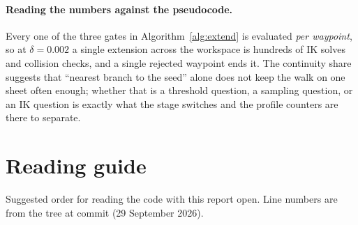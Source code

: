 \documentclass[11pt,a4paper]{article}
\newcommand{\code}[1]{\texttt{\detokenize{#1}}}
\begin{document}
\paragraph{Reading the numbers against the pseudocode.}
Every one of the three gates in Algorithm~\ref{alg:extend} is evaluated
\emph{per waypoint}, so at $\delta = 0.002$ a single extension across the
workspace is hundreds of IK solves and collision checks, and a single
rejected waypoint ends it. The continuity share suggests that ``nearest
branch to the seed'' alone does not keep the walk on one sheet often enough;
whether that is a threshold question, a sampling question, or an IK question
is exactly what the stage switches and the profile counters are there to
separate.

\section{Reading guide}
\label{sec:reading}

Suggested order for reading the code with this report open. Line numbers are
from the tree at commit \code{cd239d5} (29 September 2026).
\end{document}
